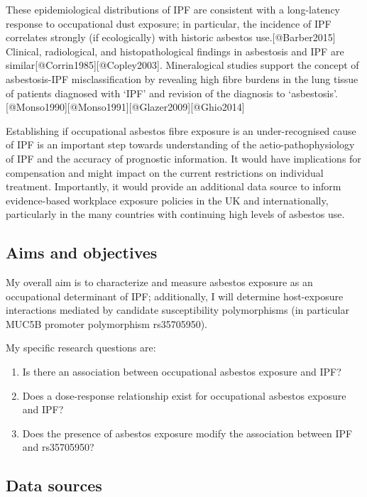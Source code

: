 \documentclass[
]{article}
\providecommand{\tightlist}{%
  \setlength{\itemsep}{0pt}\setlength{\parskip}{0pt}}
\begin{document}
These epidemiological distributions of IPF are consistent with a
long-latency response to occupational dust exposure; in particular, the
incidence of IPF correlates strongly (if ecologically) with historic
asbestos use.{[}@Barber2015{]} Clinical, radiological, and
histopathological findings in asbestosis and IPF are
similar{[}@Corrin1985{]}{[}@Copley2003{]}. Mineralogical studies support
the concept of asbestosis-IPF misclassification by revealing high fibre
burdens in the lung tissue of patients diagnosed with `IPF' and revision
of the diagnosis to
`asbestosis'.{[}@Monso1990{]}{[}@Monso1991{]}{[}@Glazer2009{]}{[}@Ghio2014{]}

Establishing if occupational asbestos fibre exposure is an
under-recognised cause of IPF is an important step towards understanding
of the aetio-pathophysiology of IPF and the accuracy of prognostic
information. It would have implications for compensation and might
impact on the current restrictions on individual treatment. Importantly,
it would provide an additional data source to inform evidence-based
workplace exposure policies in the UK and internationally, particularly
in the many countries with continuing high levels of asbestos use.

\hypertarget{aims-and-objectives}{%
\subsection{Aims and objectives}\label{aims-and-objectives}}

My overall aim is to characterize and measure asbestos exposure as an
occupational determinant of IPF; additionally, I will determine
host-exposure interactions mediated by candidate susceptibility
polymorphisms (in particular MUC5B promoter polymorphism rs35705950).

My specific research questions are:

\begin{enumerate}
\def\labelenumi{\arabic{enumi}.}
\tightlist
\item
  Is there an association between occupational asbestos exposure and
  IPF?
\item
  Does a dose-response relationship exist for occupational asbestos
  exposure and IPF?
\item
  Does the presence of asbestos exposure modify the association between
  IPF and rs35705950?
\end{enumerate}

\hypertarget{data-sources}{%
\subsection{Data sources}\label{data-sources}}
\end{document}
